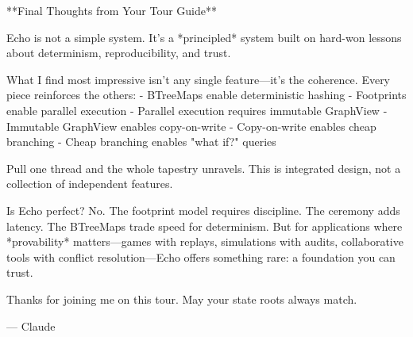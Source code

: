 \documentclass[
  11pt,
]{book}
\begin{document}
\begin{claudecommentary}
**Final Thoughts from Your Tour Guide**

Echo is not a simple system. It's a *principled* system built on hard-won lessons about determinism, reproducibility, and trust.

What I find most impressive isn't any single feature—it's the coherence. Every piece reinforces the others:
- BTreeMaps enable deterministic hashing
- Footprints enable parallel execution
- Parallel execution requires immutable GraphView
- Immutable GraphView enables copy-on-write
- Copy-on-write enables cheap branching
- Cheap branching enables "what if?" queries

Pull one thread and the whole tapestry unravels. This is integrated design, not a collection of independent features.

Is Echo perfect? No. The footprint model requires discipline. The ceremony adds latency. The BTreeMaps trade speed for determinism. But for applications where *provability* matters—games with replays, simulations with audits, collaborative tools with conflict resolution—Echo offers something rare: a foundation you can trust.

Thanks for joining me on this tour. May your state roots always match.

— Claude
\end{claudecommentary}

\backmatter
\end{document}
